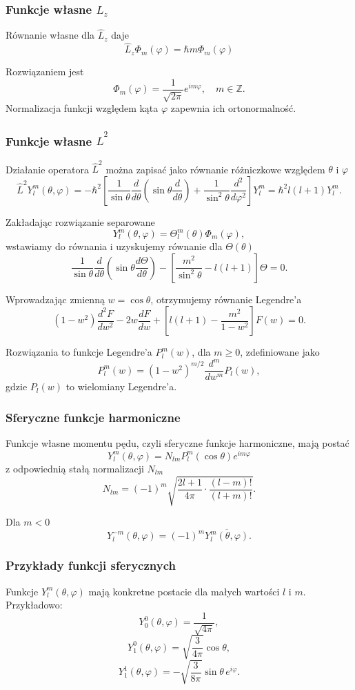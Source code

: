\subsubsection*{Funkcje własne $\hat{L}_z$}
Równanie własne dla $\hat{L}_z$ daje
$$
\hat{L}_z \Phi_m(\varphi) = \hbar m \Phi_m(\varphi)
$$

Rozwiązaniem jest
$$
\Phi_m(\varphi) = \frac{1}{\sqrt{2\pi}} e^{im\varphi}, \quad m \in \mathbb{Z}.
$$
Normalizacja funkcji względem kąta $\varphi$ zapewnia ich ortonormalność.

\subsubsection*{Funkcje własne $\hat{L}^2$}
Działanie operatora $\hat{L}^2$ można zapisać jako równanie różniczkowe względem $\theta$ i $\varphi$
$$
\hat{L}^2 Y_l^m(\theta, \varphi) = -\hbar^2 \left[ \frac{1}{\sin\theta} \frac{d}{d\theta} \left( \sin\theta \frac{d}{d\theta} \right) + \frac{1}{\sin^2\theta} \frac{d^2}{d\varphi^2} \right] Y_l^m = \hbar^2 l(l+1) Y_l^m.
$$

Zakładając rozwiązanie separowane
$$
Y_l^m(\theta, \varphi) = \Theta_l^m(\theta) \Phi_m(\varphi),
$$
wstawiamy do równania i uzyskujemy równanie dla $\Theta(\theta)$
$$
\frac{1}{\sin\theta} \frac{d}{d\theta} \left( \sin\theta \frac{d\Theta}{d\theta} \right) - \left[ \frac{m^2}{\sin^2\theta} - l(l+1) \right] \Theta = 0.
$$

Wprowadzając zmienną $w = \cos\theta$, otrzymujemy równanie Legendre'a
$$
(1 - w^2) \frac{d^2 F}{dw^2} - 2w \frac{dF}{dw} + \left[ l(l+1) - \frac{m^2}{1 - w^2} \right] F(w) = 0.
$$

Rozwiązania to funkcje Legendre'a $P_l^m(w)$, dla $m \geq 0$, zdefiniowane jako
$$
P_l^m(w) = (1 - w^2)^{m/2} \frac{d^m}{dw^m} P_l(w),
$$
gdzie $P_l(w)$ to wielomiany Legendre'a.

\subsubsection*{Sferyczne funkcje harmoniczne}
Funkcje własne momentu pędu, czyli sferyczne funkcje harmoniczne, mają postać
$$
Y_l^m(\theta, \varphi) = N_{lm} P_l^m(\cos\theta) e^{im\varphi}
$$
z odpowiednią stałą normalizacji $N_{lm}$
$$
N_{lm} = (-1)^m \sqrt{\frac{2l + 1}{4\pi} \cdot \frac{(l - m)!}{(l + m)!}}.
$$

Dla $m < 0$
$$
Y_l^{-m}(\theta, \varphi) = (-1)^m \overline{Y_l^m(\theta, \varphi)}.
$$

\subsubsection*{Przykłady funkcji sferycznych}
Funkcje $Y_l^m(\theta, \varphi)$ mają konkretne postacie dla małych wartości $l$ i $m$. Przykładowo:
$$
Y_0^0(\theta, \varphi) = \frac{1}{\sqrt{4\pi}},
$$
$$
Y_1^0(\theta, \varphi) = \sqrt{\frac{3}{4\pi}} \cos\theta,
$$
$$
Y_1^1(\theta, \varphi) = -\sqrt{\frac{3}{8\pi}} \sin\theta \, e^{i\varphi}.
$$

